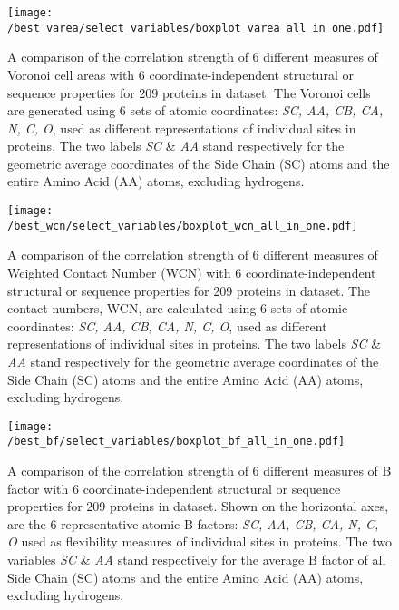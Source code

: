 \documentclass[11pt]{article}
\begin{document}
    \begin{figure}[tbh]
        \begin{center}
        \texttt{[image: /best\_varea/select\_variables/boxplot\_varea\_all\_in\_one.pdf]}
        \end{center}
        \caption{A comparison of the correlation strength of 6 different measures of Voronoi cell areas with 6 coordinate-independent structural or sequence properties for 209 proteins in dataset.  The Voronoi cells are generated using 6 sets of atomic coordinates: {\it SC, AA, CB, CA, N, C, O}, used as different representations of individual sites in proteins. The two labels {\it SC} \& {\it AA} stand respectively for the geometric average coordinates of the Side Chain (SC) atoms and the entire Amino Acid (AA) atoms, excluding hydrogens.}
        \label{fig:best_voronoi}
    \end{figure}


    \begin{figure}[tbh]
        \begin{center}
        \texttt{[image: /best\_wcn/select\_variables/boxplot\_wcn\_all\_in\_one.pdf]}
        \end{center}
        \caption{A comparison of the correlation strength of 6 different measures of Weighted Contact Number (WCN) with 6 coordinate-independent structural or sequence properties for 209 proteins in dataset. The contact numbers, WCN, are calculated using 6 sets of atomic coordinates: {\it SC, AA, CB, CA, N, C, O}, used as different representations of individual sites in proteins. The two labels {\it SC} \& {\it AA} stand respectively for the geometric average coordinates of the Side Chain (SC) atoms and the entire Amino Acid (AA) atoms, excluding hydrogens.}
        \label{fig:best_wcn}
    \end{figure}

    \begin{figure}[tbh]
        \begin{center}
        \texttt{[image: /best\_bf/select\_variables/boxplot\_bf\_all\_in\_one.pdf]}
        \end{center}
        \caption{A comparison of the correlation strength of 6 different measures of B factor with 6 coordinate-independent structural or sequence properties for 209 proteins in dataset. Shown on the horizontal axes, are the 6 representative atomic B factors: {\it SC, AA, CB, CA, N, C, O} used as flexibility measures of individual sites in proteins. The two variables {\it SC} \& {\it AA} stand respectively for the average B factor of all Side Chain (SC) atoms and the entire Amino Acid (AA) atoms, excluding hydrogens.}
        \label{fig:best_bf}
    \end{figure}
\end{document}
